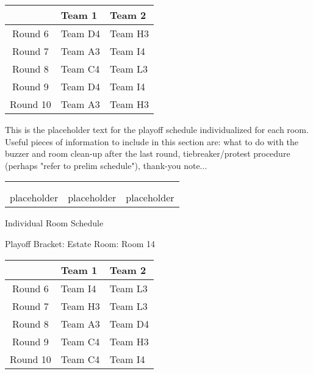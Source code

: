 \documentclass{article}%
\begin{document}
%
\begin{tabularx}{\textwidth}{|c|Y|Y|}%
\hline%
&Team 1&Team 2\\%
\hline%
Round 6&Team D4&Team H3\\%
Round 7&Team A3&Team I4\\%
Round 8&Team C4&Team L3\\%
Round 9&Team D4&Team I4\\%
Round 10&Team A3&Team H3\\%
\hline%
\end{tabularx}%
\vspace*{16pt}%
\linebreak%
This is the placeholder text for the playoff schedule individualized for each room. Useful pieces of information to include in this section are: what to do with the buzzer and room clean{-}up after the last round, tiebreaker/protest procedure (perhaps "refer to prelim schedule"), thank{-}you note...%
\vspace*{30pt}%
\newline%
%
\begin{tabularx}{\textwidth}{YYY}%
  &  &  \\%
\\%
placeholder&placeholder&placeholder\\%
\end{tabularx}%
\newpage%
\begin{center}%
\begin{Huge}%
Individual Room Schedule%
\end{Huge}%
\vspace*{16pt}%
\linebreak%
\begin{Large}%
Playoff Bracket: Estate \hfill Room: Room 14%
\end{Large}%
\end{center}%
%
\begin{tabularx}{\textwidth}{|c|Y|Y|}%
\hline%
&Team 1&Team 2\\%
\hline%
Round 6&Team I4&Team L3\\%
Round 7&Team H3&Team L3\\%
Round 8&Team A3&Team D4\\%
Round 9&Team C4&Team H3\\%
Round 10&Team C4&Team I4\\%
\hline%
\end{tabularx}%
\end{document}
